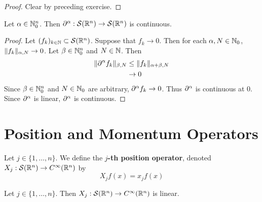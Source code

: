 \documentclass{book}
\begin{document}
	\begin{proof}
		Clear by preceding exercise.
	\end{proof}

	\begin{ex}
		Let $\alpha \in \mathbb{N}_0^n$. Then $\partial^{\alpha}: \mathcal{S}(\mathbb{R}^n) \rightarrow \mathcal{S}(\mathbb{R}^n)$ is continuous.
	\end{ex}

	\begin{proof}
			Let $(f_k)_{k \in \mathbb{N}} \subset \mathcal{S}(\mathbb{R}^n)$. Suppose that $f_k \rightarrow 0$. Then for each $\alpha, N \in \mathbb{N}_0$, $\|f_k\|_{\alpha, N} \rightarrow 0$. Let $\beta \in \mathbb{N}_0^n$ and $N \in \mathbb{N}$. Then
		\begin{align*}
			\|\partial^{\alpha}f_k\|_{\beta, N} 
			& \leq \|f_k \|_{\alpha + \beta, N} \\
			& \rightarrow 0
		\end{align*}
		Since $\beta \in \mathbb{N}_0^n$ and $N \in \mathbb{N}_0$ are arbitrary, $\partial^{\alpha}f_k \rightarrow 0$. Thus $\partial^{\alpha}$ is continuous at $0$. Since $\partial^{\alpha}$ is linear, $\partial^{\alpha}$ is continuous. 
	\end{proof}




































	\newpage
	\section{Position and Momentum Operators}
	\begin{defn}
		Let $j \in \{1, \ldots, n\}$. We define the \textbf{$j$-th position operator}, denoted $X_j: \mathcal{S}(\mathbb{R}^n) \rightarrow C^{\infty}(\mathbb{R}^n)$ by 
		$$X_jf(x) = x_j f(x)$$
	\end{defn}

	\begin{ex}
		Let $j \in \{1, \ldots, n\}$. Then $X_j: \mathcal{S}(\mathbb{R}^n) \rightarrow C^{\infty}(\mathbb{R}^n)$ is linear.
	\end{ex}
\end{document}
